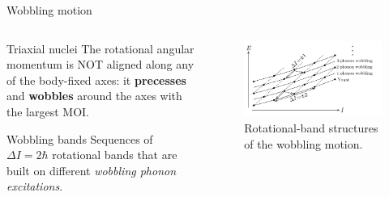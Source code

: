 \documentclass{beamer}
\begin{document}
\begin{frame}{Wobbling motion}
  \begin{columns}
    \begin{column}{0.47\textwidth}
    \begin{block}{Triaxial nuclei}
    The rotational angular momentum is NOT aligned along any of the body-fixed axes: it \textbf{precesses} and \textbf{wobbles} around the axes with the largest MOI. 
    \end{block}
  \begin{block}{Wobbling bands}
  Sequences of $\Delta I=2\hbar$ rotational bands that are built on different \textit{wobbling phonon excitations}.
  \end{block}
    \end{column}
    \begin{column}{0.53\textwidth}  %
   \begin{figure}
     \centering
     \includegraphics[scale=0.15]{figs/wobblingBands.png}
     \caption{Rotational-band structures of the wobbling motion.}
   \end{figure}
    \end{column}
    \end{columns}
\end{frame}




\end{document}

